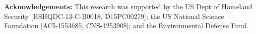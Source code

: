 \textbf{Acknowledgements:}
This research was supported by the US Dept of Homeland Security [HSHQDC-13-C-B0018, D15PC00279]; the US National Science Foundation [ACI-1553685, CNS-1253908]; and the Environmental Defense Fund.


